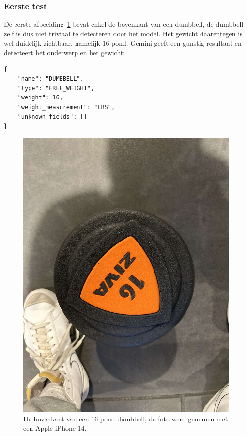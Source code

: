 \subsubsection{Eerste test}
De eerste afbeelding~\ref{fig:test-een} bevat enkel de bovenkant van een dumbbell, de dumbbell zelf is dus niet triviaal te detecteren door het model.
Het gewicht daarentegen is wel duidelijk zichtbaar, namelijk 16 pond.
Gemini geeft een gunstig resultaat en detecteert het onderwerp en het gewicht:
\begin{listing}[H]
    \begin{verbatim}
{
    "name": "DUMBBELL",
    "type": "FREE_WEIGHT",
    "weight": 16,
    "weight_measurement": "LBS",
    "unknown_fields": []
}
    \end{verbatim}
\end{listing}

\begin{figure}[H]
    \begin{center}
        \includegraphics[scale=0.1]{images/prompt1-image}
        \caption{De bovenkant van een 16 pond dumbbell, de foto werd genomen met een Apple iPhone 14.}
        \label{fig:test-een}
    \end{center}
\end{figure}


